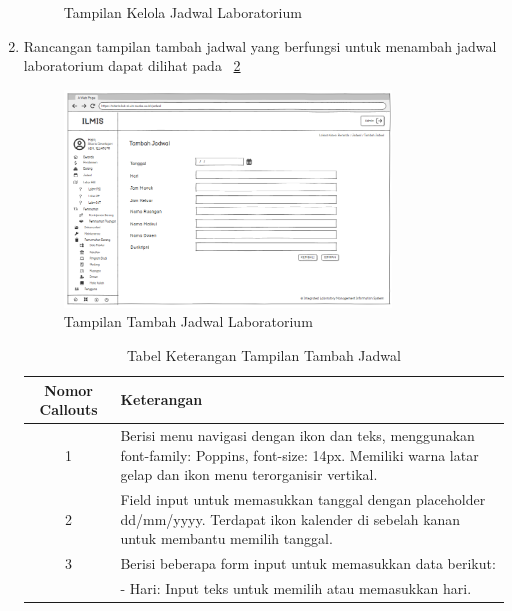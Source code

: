 \begin{enumerate}
\begin{figure}
		      \caption{Tampilan Kelola Jadwal Laboratorium}
		      \label{fig:jadwal}
	      \end{figure}
	\item Rancangan tampilan tambah jadwal yang berfungsi untuk menambah jadwal laboratorium dapat dilihat pada \pic~\ref{fig:jadwal}
	      \begin{figure}
		      \centering
		      \includegraphics[width=0.82\textwidth]{konten/gambar/tambah-jadwal.png}
		      \caption{Tampilan Tambah Jadwal Laboratorium}
		      \label{fig:jadwal}
	      \end{figure}
	      \begin{table}[H]
		      \centering
		      \caption{Tabel Keterangan Tampilan Tambah Jadwal}
		      \begin{tabular}{|c|p{}|}
			      \hline
			      \textbf{Nomor Callouts} & \textbf{Keterangan}                                                                                                                                           \\
			      \hline
			      1                       & Berisi menu navigasi dengan ikon dan teks, menggunakan font-family: Poppins, font-size: 14px. Memiliki warna latar gelap dan ikon menu terorganisir vertikal. \\
			      2                       & Field input untuk memasukkan tanggal dengan placeholder dd/mm/yyyy. Terdapat ikon kalender di sebelah kanan untuk membantu memilih tanggal.                   \\
			      3                       & Berisi beberapa form input untuk memasukkan data berikut:                                                                                                     \\
			                              & - Hari: Input teks untuk memilih atau memasukkan hari.                                                                                                        \\

\end{tabular}
\end{table}
\end{enumerate}
